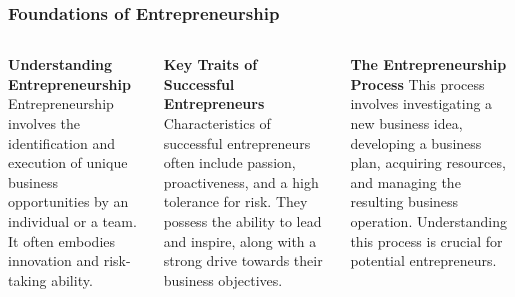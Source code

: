 \documentclass[5pt]{beamer}
\begin{document}
\begin{frame}
\frametitle{Foundations of Entrepreneurship}
\begin{columns}
\begin{column}{0.3\textwidth}
\begin{block}{\textbf{Understanding Entrepreneurship}}
Entrepreneurship involves the identification and execution of unique business opportunities by an individual or a team. It often embodies innovation and risk-taking ability.
\end{block}
\end{column}
\begin{column}{0.3\textwidth}
\begin{block}{\textbf{Key Traits of Successful Entrepreneurs}}
Characteristics of successful entrepreneurs often include passion, proactiveness, and a high tolerance for risk. They possess the ability to lead and inspire, along with a strong drive towards their business objectives.
\end{block}
\end{column}
\begin{column}{0.3\textwidth}
\begin{block}{\textbf{The Entrepreneurship Process}}
This process involves investigating a new business idea, developing a business plan, acquiring resources, and managing the resulting business operation. Understanding this process is crucial for potential entrepreneurs.
\end{block}
\end{column}
\end{columns}
\end{frame}
\end{document}
